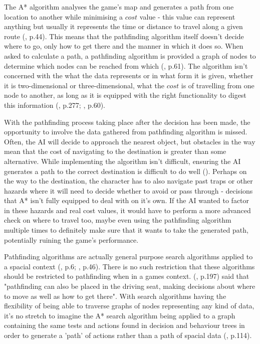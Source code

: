 \documentclass[10pt]{article}
\begin{document}
The A* algorithm analyses the game's map and generates a path from one location to another while minimising a $cost$ value - this value can represent anything but usually it represents the time or distance to travel along a given route (\cite{yap2002grid}, p.44). This means that the pathfinding algorithm itself doesn't decide where to go, only how to get there and the manner in which it does so. When asked to calculate a path, a pathfinding algorithm is provided a graph of nodes to determine which nodes can be reached from which (\cite{nareyek2004ai}, p.61). The algorithm isn't concerned with the what the data represents or in what form it is given, whether it is two-dimensional or three-dimensional, what the $cost$ is of travelling from one node to another, as long as it is equipped with the right functionality to digest this information (\cite{millington2019ai}, p.277; \cite{graham2003pathfinding}, p.60).

With the pathfinding process taking place after the decision has been made, the opportunity to involve the data gathered from pathfinding algorithm is missed. Often, the AI will decide to approach the nearest object, but obstacles in the way mean that the cost of navigating to the destination is greater than some alternative. While implementing the algorithm isn't difficult, ensuring the AI generates a path to the correct destination is difficult to do well (\cite{forbus2002qualitative}). Perhaps on the way to the destination, the character has to also navigate past traps or other hazards where it will need to decide whether to avoid or pass through - decisions that A* isn't fully equipped to deal with on it's own. If the AI wanted to factor in these hazards and real cost values, it would have to perform a more advanced check on where to travel too, maybe even using the pathfinding algorithm multiple times to definitely make sure that it wants to take the generated path, potentially ruining the game's performance.

Pathfinding algorithms are actually general purpose search algorithms applied to a spacial context (\cite{orkin2006three}, p.6; \cite{yap2002grid}, p.46). There is no such restriction that these algorithms should be restricted to pathfinding when in a games context. \citeauthor{millington2019ai} (\citeyear{millington2019ai}, p.197) said that "pathfinding can also be placed in the driving seat, making decisions about where to move as well as how to get there". With search algorithms having the flexibility of being able to traverse graphs of nodes representing any kind of data, it's no stretch to imagine the A* search algorithm being applied to a graph containing the same tests and actions found in decision and behaviour trees in order to generate a 'path' of actions rather than a path of spacial data (\cite{higgins2002generic}, p.114).
\end{document}
